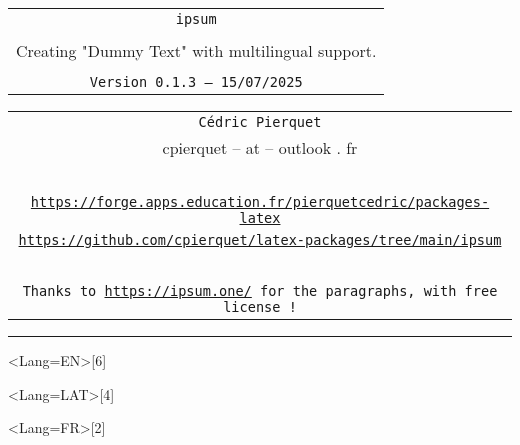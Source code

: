 \documentclass[11pt,a4paper]{ltxdoc}
\def\TPversion{0.1.3}
\def\TPdate{15/07/2025}
\begin{document}
\pagestyle{fancy}

\thispagestyle{empty}

\begin{center}
	\begin{minipage}{0.88\linewidth}
	\begin{tcolorbox}[colframe=yellow,colback=yellow!15]
		\begin{center}
			\begin{tabular}{c}
				{\Huge \texttt{ipsum}}\\
				\\
				{\LARGE Creating "Dummy Text" with multilingual support.} \\
				\\
				{\small \texttt{Version \TPversion{} -- \TPdate}}
		\end{tabular}
		\end{center}
	\end{tcolorbox}
\end{minipage}
\end{center}

\begin{center}
	\begin{tabular}{c}
	\texttt{Cédric Pierquet}\\
	{\ttfamily cpierquet -- at -- outlook . fr}\\
	~ \\
	\texttt{\url{https://forge.apps.education.fr/pierquetcedric/packages-latex}} \\
	\texttt{\url{https://github.com/cpierquet/latex-packages/tree/main/ipsum}} \\
	~ \\
	\texttt{Thanks to \url{https://ipsum.one/} for the paragraphs, with free license !}
\end{tabular}
\end{center}

\hrule

\vspace*{5mm}

\begin{tcolorbox}[colframe=lightgray,colback=lightgray!5]
\ipsum<Lang=EN>[6]
\end{tcolorbox}

\begin{tcolorbox}[colframe=lightgray,colback=lightgray!5]
\ipsum<Lang=LAT>[4]
\end{tcolorbox}

\begin{tcolorbox}[colframe=lightgray,colback=lightgray!5]
\ipsum<Lang=FR>[2]
\end{tcolorbox}
\end{document}
